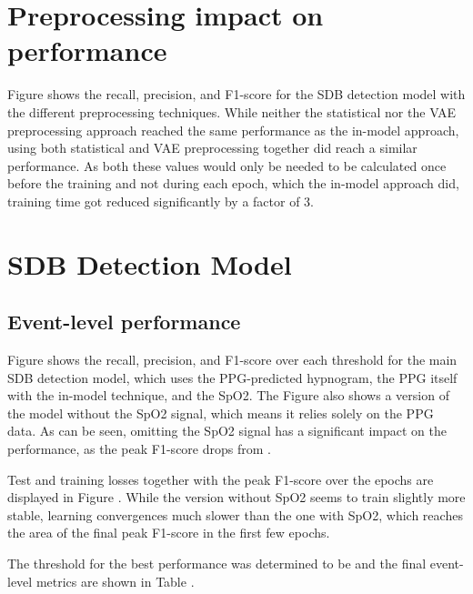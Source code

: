 \section{Preprocessing impact on performance}

Figure  shows the recall, precision, and F1-score  for the SDB detection model with the different preprocessing techniques. While neither the statistical nor the VAE preprocessing approach reached the same performance as the in-model approach, using both statistical and VAE preprocessing together did reach a similar performance. As both these values would only be needed to be calculated once before the training and not during each epoch, which the in-model approach did, training time got reduced significantly by a factor of 3.

\section{SDB Detection Model }

\subsection*{Event-level performance}

Figure  shows the recall, precision, and F1-score over each threshold for the main SDB detection model, which uses the PPG-predicted hypnogram, the PPG itself with the in-model technique, and the SpO2. The Figure also shows a version of the model without the SpO2 signal, which means it relies solely on the PPG data. As can be seen, omitting the SpO2 signal has a significant impact on the performance, as the peak F1-score drops from .

Test and training losses together with the peak F1-score over the epochs are displayed in Figure . While the version without SpO2 seems to train slightly more stable, learning convergences much slower than the one with SpO2, which reaches the area of the final peak F1-score in the first few epochs.

The threshold for the best performance was determined to be  and the final event-level metrics are shown in Table .


